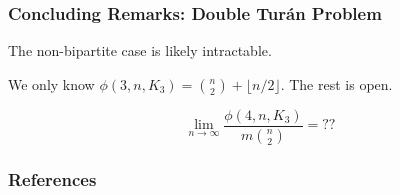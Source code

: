 \documentclass{beamer}
\begin{document}
\begin{frame}
  \frametitle{Concluding Remarks: Double Turán Problem}

  The non-bipartite case is likely intractable.

  \pause

  \vspace{0.5cm}

  We only know $\phi(3, n, K_3) = \binom{n}{2} + \lfloor n/2\rfloor$. The rest is open.

  \pause

  \vspace{0.2cm}

  \[
    \lim_{n \to \infty} \frac{\phi(4, n, K_3)}{m\binom{n}{2}} = ??
  \]
\end{frame}

\begin{frame}[allowframebreaks] 
  \frametitle{References}
  \printbibliography
\end{frame}
\end{document}
